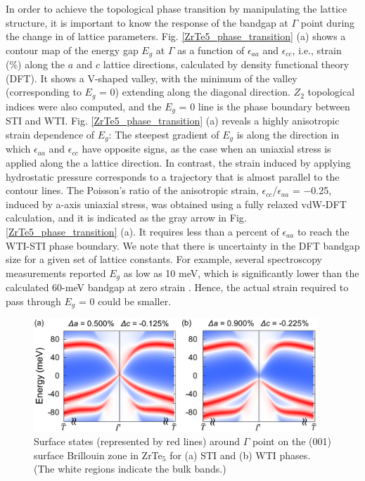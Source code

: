 In order to achieve the topological phase transition by manipulating the lattice structure, it is important to know the response of the bandgap at $\Gamma$ point during the change in of lattice parameters. Fig. \ref{ZrTe5_phase_transition} (a) shows a contour map of the energy gap $E_g$ at $\Gamma$ as a function of $\epsilon_{aa}$ and $\epsilon_{cc}$, i.e., strain (\%) along the $a$ and $c$ lattice directions, calculated by density functional theory (DFT). It shows a V-shaped valley, with the minimum of the valley (corresponding to $E_g$ = 0) extending along the diagonal direction. $Z_2$ topological indices were also computed, and the $E_g$ = 0 line is the phase boundary between STI and WTI. Fig. \ref{ZrTe5_phase_transition} (a) reveals a highly anisotropic strain dependence of $E_g$: The steepest gradient of $E_g$ is along the direction in which $\epsilon_{aa}$ and $\epsilon_{cc}$ have opposite signs, as the case when an uniaxial stress is applied along the a lattice direction. In contrast, the strain induced by applying hydrostatic pressure corresponds to a trajectory that is almost parallel to the contour lines. The Poisson’s ratio of the anisotropic strain, $\epsilon_{cc}$/$\epsilon_{aa}$ = −0.25, induced by a-axis uniaxial stress, was obtained using a fully relaxed vdW-DFT calculation, and it is indicated as the gray arrow in Fig. \ref{ZrTe5_phase_transition} (a). It requires less than a percent of $\epsilon_{aa}$ to reach the WTI-STI phase boundary. We note that there is uncertainty in the DFT bandgap size for a given set of lattice constants. For example, several spectroscopy measurements reported $E_g$ as low as 10 meV, which is significantly lower than the calculated 60-meV bandgap at zero strain \cite{chen2017spectroscopic, jiang2017landau}. Hence, the actual strain required to pass through $E_g$ = 0 could be smaller.

	\begin{figure}[htbp]
        \centering
        \captionsetup{singlelinecheck = false, justification=justified}
        \includegraphics[width=0.95\textwidth]{ZrTe5_phase_transition_SS.png}
        \caption[Surface states around $\Gamma$ point on the (001) surface Brillouin zone in ZrTe$_5$ for STI and WTI phases.]{Surface states (represented by red lines) around $\Gamma$ point on the (001) surface Brillouin zone in ZrTe$_5$ for (a) STI and (b) WTI phases. (The white regions indicate the bulk bands.)}
        \label{ZrTe5_phase_transition_SS}
    \end{figure}

